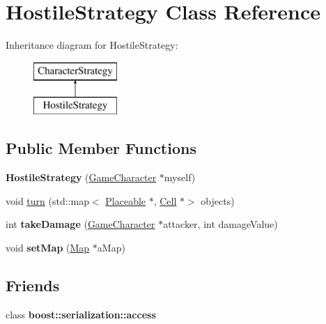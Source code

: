 \hypertarget{class_hostile_strategy}{}\section{Hostile\+Strategy Class Reference}
\label{class_hostile_strategy}
Inheritance diagram for Hostile\+Strategy\+:\begin{figure}[H]
\begin{center}
\leavevmode
\includegraphics[height=2.000000cm]{class_hostile_strategy}
\end{center}
\end{figure}
\subsection*{Public Member Functions}
\begin{DoxyCompactItemize}
\item 
\hypertarget{class_hostile_strategy_af884f2bab20bad670123aac4dbfb453a}{}\label{class_hostile_strategy_af884f2bab20bad670123aac4dbfb453a} 
{\bfseries Hostile\+Strategy} (\hyperlink{class_game_character}{Game\+Character} $\ast$myself)
\item 
void \hyperlink{class_hostile_strategy_aaca0f223b92c48cb9b6b412b26fde34f}{turn} (std\+::map$<$ \hyperlink{class_placeable}{Placeable} $\ast$, \hyperlink{class_cell}{Cell} $\ast$$>$ objects)
\item 
\hypertarget{class_hostile_strategy_ad53152ca0a675b5eaf261f8a13658144}{}\label{class_hostile_strategy_ad53152ca0a675b5eaf261f8a13658144} 
int {\bfseries take\+Damage} (\hyperlink{class_game_character}{Game\+Character} $\ast$attacker, int damage\+Value)
\item 
\hypertarget{class_hostile_strategy_abb0aa50c237c5e01f6a879d408c7518c}{}\label{class_hostile_strategy_abb0aa50c237c5e01f6a879d408c7518c} 
void {\bfseries set\+Map} (\hyperlink{class_map}{Map} $\ast$a\+Map)
\end{DoxyCompactItemize}
\subsection*{Friends}
\begin{DoxyCompactItemize}
\item 
\hypertarget{class_hostile_strategy_ac98d07dd8f7b70e16ccb9a01abf56b9c}{}\label{class_hostile_strategy_ac98d07dd8f7b70e16ccb9a01abf56b9c} 
class {\bfseries boost\+::serialization\+::access}
\end{DoxyCompactItemize}
